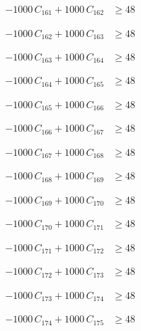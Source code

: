 \documentclass[a4paper,11pt]{article}
\begin{document}
\begin{align}
-1000\,C_{161} + 1000\,C_{162} &\geq 48 \nonumber
\end{align}

\begin{align}
-1000\,C_{162} + 1000\,C_{163} &\geq 48 \nonumber
\end{align}

\begin{align}
-1000\,C_{163} + 1000\,C_{164} &\geq 48 \nonumber
\end{align}

\begin{align}
-1000\,C_{164} + 1000\,C_{165} &\geq 48 \nonumber
\end{align}

\begin{align}
-1000\,C_{165} + 1000\,C_{166} &\geq 48 \nonumber
\end{align}

\begin{align}
-1000\,C_{166} + 1000\,C_{167} &\geq 48 \nonumber
\end{align}

\begin{align}
-1000\,C_{167} + 1000\,C_{168} &\geq 48 \nonumber
\end{align}

\begin{align}
-1000\,C_{168} + 1000\,C_{169} &\geq 48 \nonumber
\end{align}

\begin{align}
-1000\,C_{169} + 1000\,C_{170} &\geq 48 \nonumber
\end{align}

\begin{align}
-1000\,C_{170} + 1000\,C_{171} &\geq 48 \nonumber
\end{align}

\begin{align}
-1000\,C_{171} + 1000\,C_{172} &\geq 48 \nonumber
\end{align}

\begin{align}
-1000\,C_{172} + 1000\,C_{173} &\geq 48 \nonumber
\end{align}

\begin{align}
-1000\,C_{173} + 1000\,C_{174} &\geq 48 \nonumber
\end{align}

\begin{align}
-1000\,C_{174} + 1000\,C_{175} &\geq 48 \nonumber
\end{align}
\end{document}
